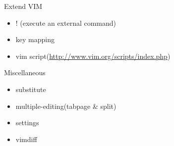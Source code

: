 \documentclass[c]{beamer}
\begin{document}
\begin{frame}{Extend VIM}
    \pause
    \begin{itemize}
        \item ! (execute an external command)
        \pause
        \item key mapping
        \pause
        \item vim script(\url{http://www.vim.org/scripts/index.php})
    \end{itemize}
\end{frame}

\begin{frame}{Miscellaneous}
    \pause
    \begin{itemize}
        \item substitute
        \pause
        \item multiple-editing(tabpage \& split)
        \pause
        \item settings
        \pause
        \item vimdiff
    \end{itemize}
\end{frame}
\end{document}

